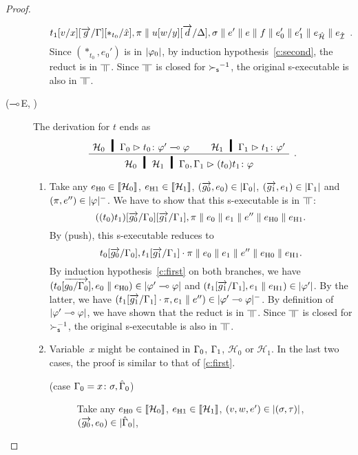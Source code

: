 \begin{proof}
\begin{description}
\begin{enumerate}[label=\textit{(\arabic{*})}]
	       \[
		t_1[v/x][\overrightarrow{g}/\Gamma][\ast_{t_0}/\hat x],\pi\parallel
	       u[w/y][\overrightarrow{d}/\Delta],\sigma\parallel
	       e'\parallel {e}\parallel {f} \parallel{e_0'}\parallel{e_1'}\parallel
	       e_{\hat{\mathcal{H}}}\parallel e_{\hat{\mathcal{I}}}\enspace.
	       \]
	       Since $(\ast_{t_0},e_0')$ is in $|{\varphi_0}|$,
	       by induction hypothesis~\ref{c:second}, the reduct is in
	       $\bbot$.  Since $\bbot$ is closed for ${\succ_{\mathsf s}}^{-1}$,
	       the original s-executable is also in $\bbot$.
	\end{enumerate}
   \item[($\multimap$E, \textminus)]
	The derivation for $t$ ends as
	\[
	\aseq{\hyp{_0}\G_0}{\tj{t_0}{\phi'\limp\phi}}
	\aseq{\hyp{_1}\G_1}{\tj{t_1}{\phi'}}
	\bseq{\hyp{_0}\hyp{_1}\G_0,\G_1}{\tj{(t_0)t_1}{\phi}}
	\DisplayProof\enspace.
	\]
	\begin{enumerate}[label=\textit{(\arabic{*})}]
	 \item Take any
	       $e_{\mathrm{H0}}\in\llbracket{\mathcal H_0}\rrbracket$,
	       $e_{\mathrm{H1}}\in\llbracket{\mathcal H_1}\rrbracket$,
	       $(\overrightarrow{g_0},{e_0})\in|{\Gamma_0}|$,
	       $(\overrightarrow{g_1},{e_1})\in|{\Gamma_1}|$ and
	       $(\pi,e'')\in|{\varphi}|^-$.
	       We have to show that this s-executable is in $\bbot$:
	       \[
		((t_0)t_1)[\overrightarrow{g_0}/\Gamma_0][\overrightarrow{g_1}/\Gamma_1],\pi\parallel
	       {e_0}\parallel {e_1}\parallel e''\parallel e_{\mathrm{H0}}\parallel e_{\mathrm{H1}}.
	       \]
	       By (push), this s-executable reduces to
	       \[
		t_0[\overrightarrow{g_0}/\Gamma_0], t_1[\overrightarrow{g_1}/\Gamma_1]\cdot \pi
	       \parallel {e_0}\parallel {e_1}\parallel e''\parallel e_{\mathrm{H0}}\parallel e_{\mathrm{H1}}.
	       \]
	       By induction hypothesis~\ref{c:first} on both branches,
	       we have $(t_0[\overrightarrow{g_0/\Gamma_0}],
	       {e_0\parallel e_{\mathrm{H0}}})\in|{\varphi'\multimap\varphi}|$
	       and
	       $(t_1[\overrightarrow{g_1}/\Gamma_1],{e_1\parallel e_{\mathrm{H1}}})\in|{\varphi'}|$.
	       By the latter, we have $(t_1[\overrightarrow{g_1}/\Gamma_1]\cdot\pi,
	       {e_1}\parallel e'')\in|{\varphi'\multimap\varphi}|^-$.
	       By definition of $|{\varphi'\multimap\varphi}|$, we have shown that the
	       reduct is in $\bbot$.
	       Since $\bbot$ is closed for $\succ_{\mathsf s}^{-1}$,
	       the original s-executable is also in $\bbot$.
	 \item Variable~$x$ might be contained in $\Gamma_0$, $\Gamma_1$,
	       $\mathcal H_0$ or $\mathcal H_1$.
	       In the last two cases, the proof is similar to that of
	       \ref{c:first}.
	       \begin{description}
		\item[(case $\Gamma_0 = {x} \colon{\sigma},\hat{\Gamma}_0$)]
		     Take any
		     $e_{\mathrm{H0}}\in\llbracket{\mathcal H_0}\rrbracket$,
		     $e_{\mathrm{H1}}\in\llbracket{\mathcal H_1}\rrbracket$,
		     $(v,w,e')\in|{(\sigma,\tau)}|$,
		     $(\overrightarrow{g_0},{e_0})\in|{\hat{\Gamma}_0}|$,

\end{description}
\end{enumerate}
\end{description}
\end{proof}
